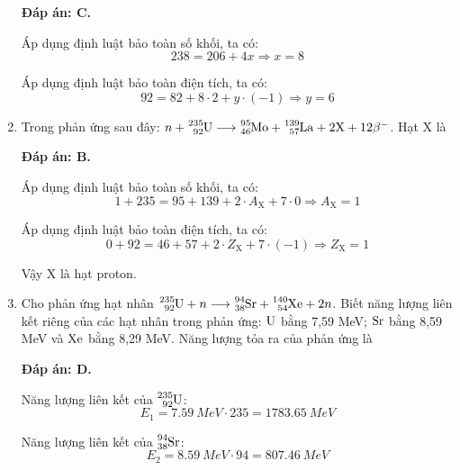 \begin{enumerate}[label=\bfseries Câu \arabic*:]
	\loigiai
	{		\textbf{Đáp án: C.}
		
		Áp dụng định luật bảo toàn số khối, ta có:
		$$238 = 206 + 4x \Rightarrow x = 8$$
		
		Áp dụng định luật bảo toàn điện tích, ta có:
		$$92 = 82 + 8 \cdot 2 + y \cdot (-1) \Rightarrow y = 6$$
		
	}
	
	\item {}
	
	\cauhoi
	{Trong phản ứng sau đây: $n+ \ce{^{235}_{92} U} \longrightarrow \ce{^{95}_{46} Mo} + \ce{^{139}_{57} La} + 2\text{X} + 12\beta^{-}$. Hạt X là
	}
	
	\loigiai
	{		\textbf{Đáp án: B.}
		
		Áp dụng định luật bảo toàn số khối, ta có:
		$$1+235=95+139+2\cdot A_{\text{X}} + 7 \cdot 0 \Rightarrow A_{\text{X}} = 1$$
		
		Áp dụng định luật bảo toàn điện tích, ta có:
		$$0 + 92 = 46 + 57 + 2 \cdot Z_{\text{X}} + 7 \cdot (-1) \Rightarrow Z_{\text{X}} = 1$$
		
		Vậy X là hạt proton.
		
	}
	

	\item {}
	
	\cauhoi
	{Cho phản ứng hạt nhân $\ce{^{235}_{92} U} + n \longrightarrow \ce{^{94}_{38} Sr} + \ce{^{140}_{54} Xe} + 2n$. Biết năng lượng liên kết riêng của các hạt nhân trong phản ứng: $\ce{U}$ bằng 7,59 MeV; $\ce{Sr}$ bằng 8,59 MeV và $\ce{Xe}$ bằng 8,29 MeV. Năng lượng tỏa ra của phản ứng là
	}
	
	\loigiai
	{		\textbf{Đáp án: D.}
		
		Năng lượng liên kết của $\ce{^{235}_{92} U}$:
		$$E_1 = \SI{7.59}{MeV} \cdot 235 = \SI{1783.65}{MeV}$$
		
		Năng lượng liên kết của $\ce{^{94}_{38} Sr}$:
		$$E_2 = \SI{8.59}{MeV} \cdot 94 = \SI{807.46}{MeV}$$
		
}
\end{enumerate}
